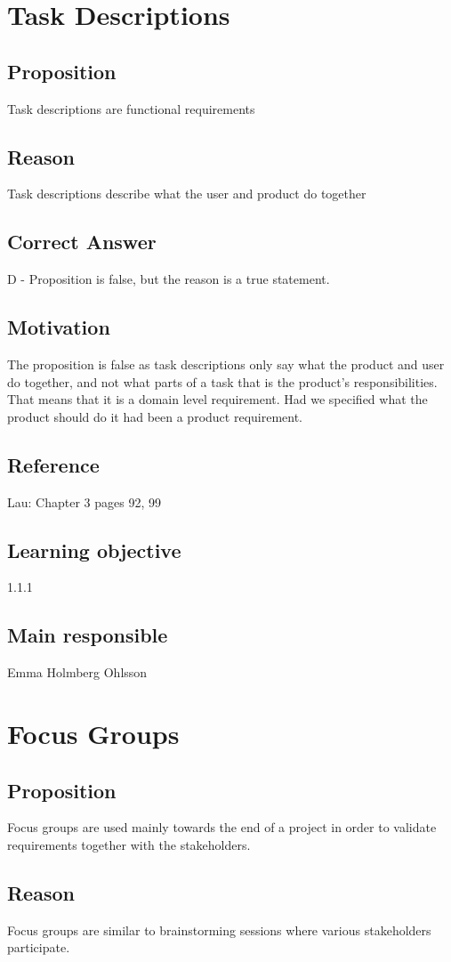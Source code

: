 \documentclass[a4paper]{article}
\begin{document}
\section{Task Descriptions}
\subsection*{Proposition}
Task descriptions are functional requirements
\subsection*{Reason}
Task descriptions describe what the user and product do together
\subsection*{Correct Answer}
D - Proposition is false, but the reason is a true statement.
\subsection*{Motivation}
The proposition is false as task descriptions only say what the product and user do together, and not what parts of a task that is the product’s responsibilities. That means that it is a domain level requirement. Had we specified what the product should do it had been a product requirement.
\subsection*{Reference}
Lau: Chapter 3 pages 92, 99
\subsection*{Learning objective}
1.1.1
\subsection*{Main responsible}
Emma Holmberg Ohlsson


\section{Focus Groups}
\subsection*{Proposition}
Focus groups are used mainly towards the end of a project in order to validate requirements together with the stakeholders.
\subsection*{Reason}
Focus groups are similar to brainstorming sessions where various stakeholders participate.
\end{document}
